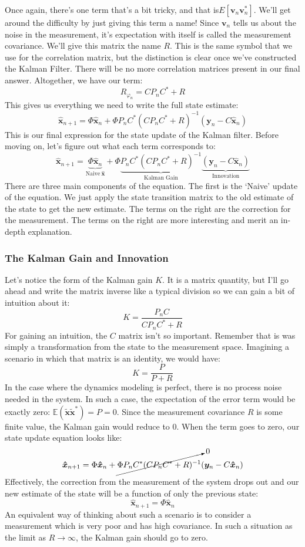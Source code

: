 Once again, there's one term that's a bit tricky, and that is$E[\bm{v}_n\bm{v}_n^*]$. We'll get around the difficulty by just giving this term a name! Since $\bm{v}_n$ tells us about the noise in the measurement, it's expectation with itself is called the measurement covariance. We'll give this matrix the name $R$. This is the same symbol that we use for the correlation matrix, but the distinction is clear once we've constructed the Kalman Filter. There will be no more correlation matrices present in our final answer. Altogether, we have our term:
$$R_{\varphi_n}=CP_nC^*+R$$
This gives us everything we need to write the full state estimate:
$$\bm{\hat{x}}_{n+1}=\Phi \bm{\hat{x}}_{n}+\Phi P_nC^*(CP_nC^*+R)^{-1}(\bm{y}_n-C\bm{\hat{x}}_n)$$
This is our final expression for the state update of the Kalman filter. Before moving on, let's figure out what each term corresponds to:
$$\bm{\hat{x}}_{n+1}={\underbrace{\Phi \bm{\hat{x}}_{n}}_{\mathrm{Naive\ } \bm{\hat{x}}}}+\Phi \underbrace{P_nC^*(CP_nC^*+R)^{-1}}_\text{Kalman Gain}\underbrace{(\bm{y}_n-C\bm{\hat{x}}_n)}_\text{Innovation}$$
There are three main components of the equation. The first is the `Naive' update of the equation. We just apply the state transition matrix to the old estimate of the state to get the new estimate. The terms on the right are the correction for the measurement. The terms on the right are more interesting and merit an in-depth explanation.

\subsubsection{The Kalman Gain and Innovation}

Let's notice the form of the Kalman gain $K$. It is a matrix quantity, but I'll go ahead and write the matrix inverse like a typical division so we can gain a bit of intuition about it:
$$K=\frac{P_nC}{CP_nC^*+R}$$
For gaining an intuition, the $C$ matrix isn't so important. Remember that is was simply a transformation from the state to the measurement space. Imagining a scenario in which that matrix is an identity, we would have:
$$K=\frac{P}{P+R}$$
In the case where the dynamics modeling is perfect, there is no process noise needed in the system. In such a case, the expectation of the error term would be exactly zero: $\mathbb{E}(\bm{\tilde{x}}\bm{\tilde{x}}^*)=P=0$. Since the measurement covariance $R$ is some finite value, the Kalman gain would reduce to $0$. When the term goes to zero, our state update equation looks like:
$$\bm{\hat{x}}_{n+1}={\Phi \bm{\hat{x}}_{n}}+\cancelto{0}{\Phi P_nC^*(CP_nC^*+R)^{-1}}(\bm{y}_n-C\bm{\hat{x}}_n)$$
Effectively, the correction from the measurement of the system drops out and our new estimate of the state will be a function of only the previous state:
$$\bm{\hat{x}}_{n+1}={\Phi \bm{\hat{x}}_{n}}$$
An equivalent way of thinking about such a scenario is to consider a measurement which is very poor and has high covariance. In such a situation as the limit as $R\rightarrow\infty$, the Kalman gain should go to zero.

